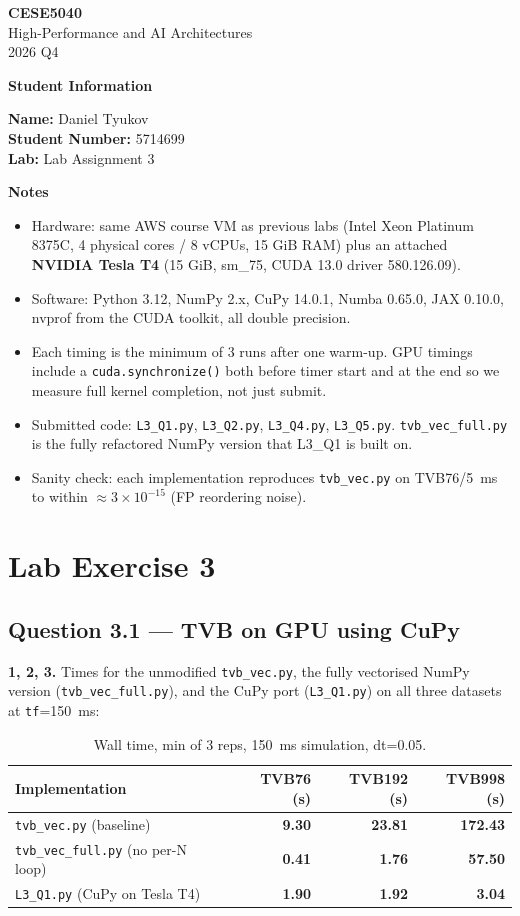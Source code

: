 \documentclass[11pt,a4paper]{article}
\newcommand{\courseheader}{
    \begin{center}
        {\sffamily\Large\bfseries CESE5040}\\[0.3em]
        {\sffamily High-Performance and AI Architectures}\\
        {\color{lightgray}2026 Q4}
    \end{center}
}
\newcommand{\Q}[1]{\subsection*{Question #1}}
\newcommand{\Qpart}[1]{\textbf{#1.}}
\begin{document}
\courseheader
\vspace{1em}

{\color{headingcolor}\sffamily\large\bfseries Student Information}

\textbf{Name:} Daniel Tyukov\\
\textbf{Student Number:} 5714699\\
\textbf{Lab:} Lab Assignment 3

{\color{headingcolor}\sffamily\large\bfseries Notes}

\begin{itemize}
    \item Hardware: same AWS course VM as previous labs
    (Intel Xeon Platinum 8375C, 4 physical cores / 8 vCPUs, 15 GiB RAM)
    plus an attached \textbf{NVIDIA Tesla T4} (15 GiB, sm\_75, CUDA 13.0
    driver 580.126.09).
    \item Software: Python 3.12, NumPy 2.x, CuPy 14.0.1, Numba 0.65.0,
    JAX 0.10.0, nvprof from the CUDA toolkit, all double precision.
    \item Each timing is the minimum of 3 runs after one warm-up. GPU
    timings include a \texttt{cuda.synchronize()} both before timer start
    and at the end so we measure full kernel completion, not just submit.
    \item Submitted code: \texttt{L3\_Q1.py}, \texttt{L3\_Q2.py},
    \texttt{L3\_Q4.py}, \texttt{L3\_Q5.py}. \texttt{tvb\_vec\_full.py} is
    the fully refactored NumPy version that L3\_Q1 is built on.
    \item Sanity check: each implementation reproduces \texttt{tvb\_vec.py}
    on TVB76/5~ms to within $\approx 3 \times 10^{-15}$ (FP reordering noise).
\end{itemize}

\vspace{0.5em}

\section*{\color{headingcolor}Lab Exercise 3}

\Q{3.1 — TVB on GPU using CuPy}

\Qpart{1, 2, 3} Times for the unmodified \texttt{tvb\_vec.py}, the fully
vectorised NumPy version (\texttt{tvb\_vec\_full.py}), and the CuPy port
(\texttt{L3\_Q1.py}) on all three datasets at \texttt{tf}=150~ms:

\begin{table}[h]
\centering
\small
\begin{tabular}{lrrr}
\toprule
Implementation & TVB76 (s) & TVB192 (s) & TVB998 (s) \\
\midrule
\texttt{tvb\_vec.py} (baseline)              & \textbf{9.30}    & \textbf{23.81}   & \textbf{172.43} \\
\texttt{tvb\_vec\_full.py} (no per-N loop)   & \textbf{0.41}    & \textbf{1.76}    & \textbf{57.50}  \\
\texttt{L3\_Q1.py} (CuPy on Tesla T4)        & \textbf{1.90}    & \textbf{1.92}    & \textbf{3.04}   \\
\bottomrule
\end{tabular}
\caption{Wall time, min of 3 reps, 150~ms simulation, dt=0.05.}
\end{table}
\end{document}
